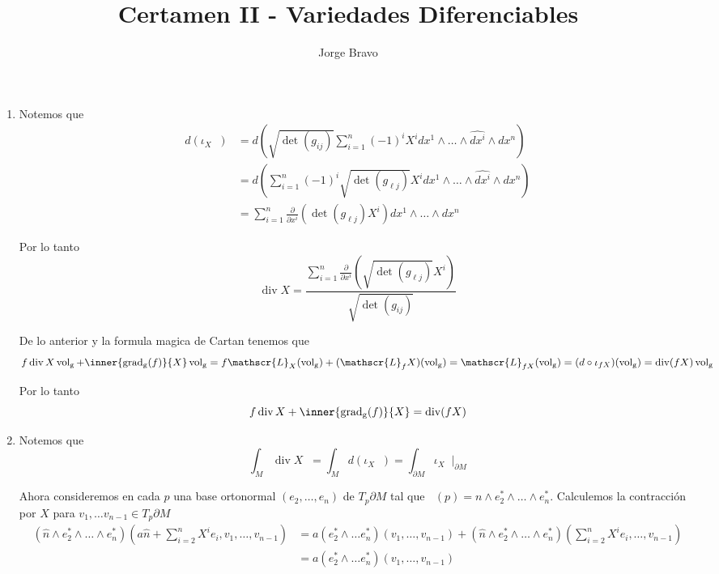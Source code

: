 \documentclass[a4paper,oneside,10.5pt]{USMArt}
\title{Certamen II - Variedades Diferenciables}
\author{Jorge Bravo}
\DeclareMathOperator{\volg}{vol_g}
\DeclareMathOperator{\dive}{div}
\begin{document}
\maketitle

\newcommand{\TT}{\mathbf{T}}

\begin{sol}\hfill
  \begin{enumerate}
  \item Notemos que
  \begin{align*}
    d(\iota_{X} \volg) &= d(\sqrt{\det(g_{ij})} \sum_{i = 1}^{n} (-1)^{i} X^{i} dx^{1} \wedge \dots \wedge \hat{dx^{i}} \wedge dx^{n})\\
                       &= d(\sum_{i = 1}^{n} (-1)^{i} \sqrt{\det (g_{\ell j})} X^{i} dx^{1} \wedge \dots \wedge \hat{dx^{i}} \wedge dx^{n})\\
     &= \sum_{i = 1}^{n} \frac{\partial}{\partial x^{i}} (\det(g_{\ell j}) X^{i}) dx^{1} \wedge \dots \wedge dx^{n}
  \end{align*}

  Por lo tanto
  \begin{equation*}
    \dive X = \frac{\sum_{i = 1}^{n} \frac{\partial}{\partial x^{i}} (\sqrt{\det (g_{\ell j})}X^{i})}{\sqrt{\det(g_{ij})}}
  \end{equation*}

  De lo anterior y la formula magica de Cartan tenemos que
  \begin{equation*}
   f \dive X \volg + \inner{\operatorname{grad_{g}}(f)}{X} \volg= f \mathscr{L}_{X}(\volg) + (\mathscr{L}_{f}X)(\volg) = \mathscr{L}_{fX}(\volg) = (d \circ \iota_{fX})(\volg) = \dive (fX) \volg
  \end{equation*}

  Por lo tanto
  \begin{equation*}
    f \dive X + \inner{\operatorname{grad_{g}}(f)}{X} = \dive(fX)
  \end{equation*}

    \item Notemos que
          \begin{equation*}
            \int_{M} \dive X \volg = \int_{M} d(\iota_{X} \volg) = \int_{\partial M} \iota_{X} \volg|_{\partial M}
          \end{equation*}

          Ahora consideremos en cada $p$ una base ortonormal $(e_{2}, \dots, e_{n})$ de $T_{p}\partial M$ tal que $\volg(p) = n \wedge e_{2}^{*} \wedge \dots \wedge e_{n}^{*}$. Calculemos la contracci\'on por $X$ para $v_{1}, \dots v_{n - 1} \in T_{p}\partial M$
          \begin{align*}
            (\hat{n} \wedge e_{2}^{*} \wedge \dots \wedge e_{n}^{*})(a\hat{n} + \sum_{i = 2}^{n} X^{i}e_{i}, v_{1}, \dots, v_{n -1}) &= a(e_{2}^{*} \wedge \dots e_{n}^{*})(v_{1}, \dots, v_{n -1}) + (\hat{n} \wedge e_{2}^{*} \wedge \dots \wedge e_{n}^{*})(\sum_{i = 2}^{n} X^{i}e_{i}, \dots, v_{n - 1})\\
            &= a(e_{2}^{*} \wedge \dots e_{n}^{*})(v_{1}, \dots, v_{n - 1})
          \end{align*}


\end{enumerate}
\end{sol}
\end{document}
